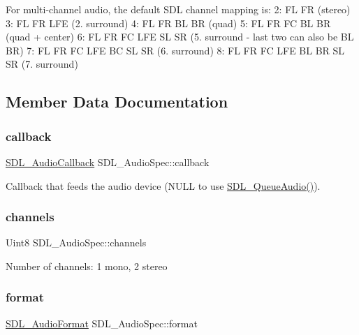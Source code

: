 For multi-\/channel audio, the default S\+DL channel mapping is\+: 2\+: FL FR (stereo) 3\+: FL FR L\+FE (2. surround) 4\+: FL FR BL BR (quad) 5\+: FL FR FC BL BR (quad + center) 6\+: FL FR FC L\+FE SL SR (5. surround -\/ last two can also be BL BR) 7\+: FL FR FC L\+FE BC SL SR (6. surround) 8\+: FL FR FC L\+FE BL BR SL SR (7. surround) 

\subsection{Member Data Documentation}
\mbox{\label{struct_s_d_l___audio_spec_a1f8d05139f1679dcf359f49251233eac}} 
\subsubsection{\texorpdfstring{callback}{callback}}
{\footnotesize\ttfamily \mbox{\hyperlink{_s_d_l__audio_8h_a379fcc25845e46bfa80cb3619fc2821c}{S\+D\+L\+\_\+\+Audio\+Callback}} S\+D\+L\+\_\+\+Audio\+Spec\+::callback}

Callback that feeds the audio device (N\+U\+LL to use \mbox{\hyperlink{_s_d_l__audio_8h_a19ef6fa2396f581aaf4d9a9512972268}{S\+D\+L\+\_\+\+Queue\+Audio()}}). \mbox{\label{struct_s_d_l___audio_spec_a31fe8b3710cf23bbef24be8a1749fe46}} 
\subsubsection{\texorpdfstring{channels}{channels}}
{\footnotesize\ttfamily Uint8 S\+D\+L\+\_\+\+Audio\+Spec\+::channels}

Number of channels\+: 1 mono, 2 stereo \mbox{\label{struct_s_d_l___audio_spec_ae37c634cac5807762f184c8d5d49fc2d}} 
\subsubsection{\texorpdfstring{format}{format}}
{\footnotesize\ttfamily \mbox{\hyperlink{_s_d_l__audio_8h_a491ed103fd25d920c4e6b7495217ce66}{S\+D\+L\+\_\+\+Audio\+Format}} S\+D\+L\+\_\+\+Audio\+Spec\+::format}

